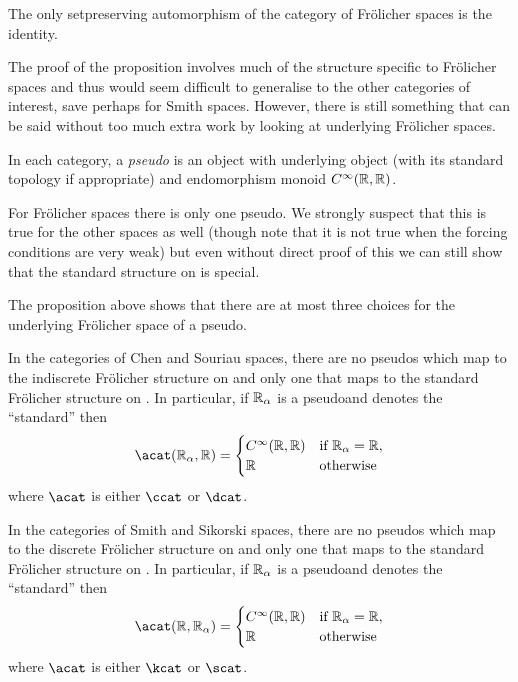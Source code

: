 \documentclass[%
12pt,%
arxiv,%
defaults
]{myclass}
\begin{document}
\begin{corollary}
The only set\enhyp{}preserving automorphism of the category of Fr\"olicher spaces is the identity. \noproof
\end{corollary}

The proof of the proposition involves much of the structure specific to Fr\"olicher spaces and thus would seem difficult to generalise to the other categories of interest, save perhaps for Smith spaces.
However, there is still something that can be said without too much extra work by looking at underlying Fr\"olicher spaces.

\begin{defn}
In each category, a \emph{pseudo\enhyp{}\R{}} is an object with underlying object \R (with its standard topology if appropriate) and endomorphism monoid \(C^\infty(\mathbb{R},\mathbb{R})\).
\end{defn}

For Fr\"olicher spaces there is only one pseudo\enhyp{}\R.
We strongly suspect that this is true for the other spaces as well (though note that it is not true when the forcing conditions are very weak) but even without direct proof of this we can still show that the standard structure on \R is special.

The proposition above shows that there are at most three choices for the underlying Fr\"olicher space of a pseudo\enhyp{}\R.

\begin{proposition}
In the categories of Chen and Souriau spaces, there are no pseudo\enhyp{}\R{}s which map to the indiscrete Fr\"olicher structure on \R and only one that maps to the standard Fr\"olicher structure on \R.
In particular, if \(\mathbb{R}_\alpha\) is a pseudo\enhyp{}\R and \R denotes the ``standard'' \R then
%
\[
  \Hom{\acat}{\R_\alpha}{\R} = \begin{cases}
  \Ci(\R,\R) & \text{if } \R_\alpha = \R, \\
%
  \R & \text{otherwise}
  \end{cases}
\]
%
where \(\acat\) is either \(\ccat\) or \(\dcat\).

In the categories of Smith and Sikorski spaces, there are no pseudo\enhyp{}\R{}s which map to the discrete Fr\"olicher structure on \R and only one that maps to the standard Fr\"olicher structure on \R.
In particular, if \(\mathbb{R}_\alpha\) is a pseudo\enhyp{}\R and \R denotes the ``standard'' \R then
%
\[
  \Hom{\acat}{\R}{\R_\alpha} = \begin{cases}
  \Ci(\R,\R) & \text{if } \R_\alpha = \R, \\
%
  \R & \text{otherwise}
  \end{cases}
\]
%
where \(\acat\) is either \(\kcat\) or \(\scat\).
\end{proposition}
\end{document}
